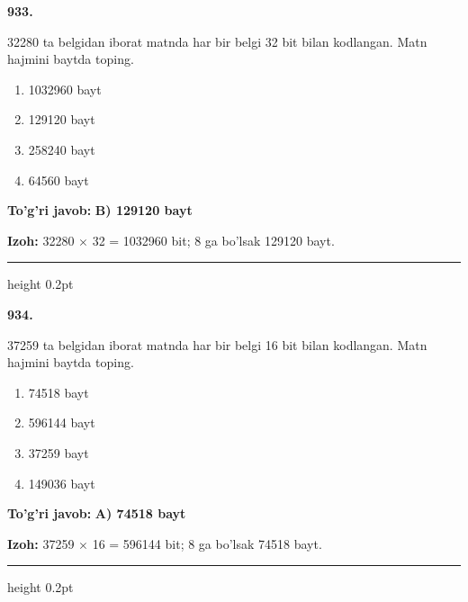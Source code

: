 \documentclass[10pt,a4paper,oneside]{article}
\begin{document}
\noindent\textbf{\color{ink}933.}
\par
32280 ta belgidan iborat matnda har bir belgi 32 bit bilan kodlangan. Matn hajmini baytda toping.
\begin{enumerate}[label=\Alph*),leftmargin=9mm]
\item 1032960 bayt
\item 129120 bayt
\item 258240 bayt
\item 64560 bayt
\end{enumerate}
\begin{tcolorbox}[enhanced,breakable,colback=teal!4,colframe=teal!50!black,boxrule=0.5pt,arc=1.1mm,left=3mm,right=3mm,top=1.7mm,bottom=1.7mm,before skip=2mm,after skip=2mm]
\textbf{\color{teal}To'g'ri javob:} \textbf{B) 129120 bayt}
\par\smallskip
\textbf{Izoh:} 32280 \ensuremath{\times} 32 = 1032960 bit; 8 ga bo'lsak 129120 bayt.
\end{tcolorbox}
\vspace{2mm}\hrule height 0.2pt \vspace{3mm}

\noindent\textbf{\color{ink}934.}
\par
37259 ta belgidan iborat matnda har bir belgi 16 bit bilan kodlangan. Matn hajmini baytda toping.
\begin{enumerate}[label=\Alph*),leftmargin=9mm]
\item 74518 bayt
\item 596144 bayt
\item 37259 bayt
\item 149036 bayt
\end{enumerate}
\begin{tcolorbox}[enhanced,breakable,colback=teal!4,colframe=teal!50!black,boxrule=0.5pt,arc=1.1mm,left=3mm,right=3mm,top=1.7mm,bottom=1.7mm,before skip=2mm,after skip=2mm]
\textbf{\color{teal}To'g'ri javob:} \textbf{A) 74518 bayt}
\par\smallskip
\textbf{Izoh:} 37259 \ensuremath{\times} 16 = 596144 bit; 8 ga bo'lsak 74518 bayt.
\end{tcolorbox}
\vspace{2mm}\hrule height 0.2pt \vspace{3mm}
\end{document}
